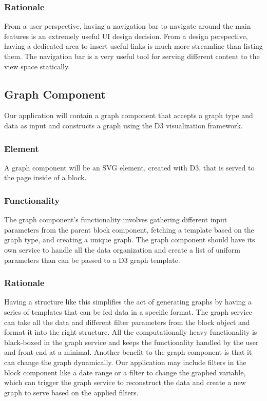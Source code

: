 \documentclass[journal,10pt,onecolumn,compsoc]{IEEEtran}
\begin{document}
	\subsubsection{Rationale}
    From a user perspective, having a navigation bar to navigate around the main features is an extremely useful UI design decision. From a design perspective, having a dedicated area to insert useful links is much more streamline than listing them. The navigation bar is a very useful tool for serving different content to the view space statically.
    \subsection{Graph Component}
    Our application will contain a graph component that accepts a graph type and data as input and constructs a graph using the D3 visualization framework.
    \subsubsection{Element}
    A graph component will be an SVG element, created with D3, that is served to the page inside of a block. 
    \subsubsection{Functionality}
    The graph component's functionality involves gathering different input parameters from the parent block component, fetching a template based on the graph type, and creating a unique graph. The graph component should have its own service to handle all the data organization and create a list of uniform parameters than can be passed to a D3 graph template.
    \subsubsection{Rationale}
    Having a structure like this simplifies the act of generating graphs by having a series of templates that can be fed data in a specific format. The graph service can take all the data and different filter parameters from the block object and format it into the right structure. All the computationally heavy functionality is black-boxed in the graph service and keeps the functionality handled by the user and front-end at a minimal. Another benefit to the graph component is that it can change the graph dynamically. Our application may include filters in the block component like a date range or a filter to change the graphed variable, which can trigger the graph service to reconstruct the data and create a new graph to serve based on the applied filters.
\end{document}
